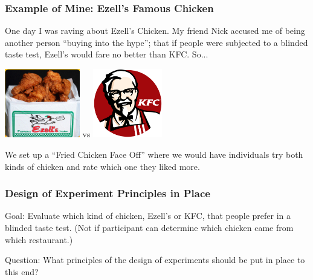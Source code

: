 \documentclass[slides]{beamer}
\newcommand{\blue}[1]{\textcolor{blue2}{#1}}
\begin{document}
\begin{frame}
\frametitle{Example of Mine: Ezell's Famous Chicken}
One day I was raving about Ezell's Chicken.  My friend Nick accused me of being another person ``buying into the hype''; that if people were subjected to a blinded taste test, Ezell's would fare no better than KFC.  So...

\vspace{0.25cm}

\pause\begin{center}
\includegraphics[height=3cm]{figure/ezells2.png} \hspace{0.5cm} vs \hspace{0.5cm} 
\includegraphics[height=3cm]{figure/KFC.png}
\end{center}

\vspace{0.25cm}

We set up a ``Fried Chicken Face Off'' where we would have individuals try both kinds of chicken and rate which one they liked more.  


\end{frame}


\begin{frame}
\frametitle{Design of Experiment Principles in Place}

\blue{Goal}: Evaluate which kind of chicken, Ezell's or KFC, that people prefer in a blinded taste test.  (Not if participant can determine which chicken came from which restaurant.)

\vspace{0.25cm}

\blue{Question}: What principles of the design of experiments should be put in place to this end?
\end{frame}
\end{document}
